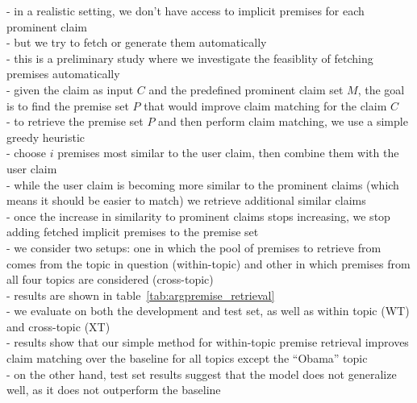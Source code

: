 \noindent - in a realistic setting, we don't have access to implicit premises 
for each prominent claim \\
- but we try to fetch or generate them automatically \\
- this is a preliminary study where we investigate the feasiblity of fetching 
premises automatically \\
- given the claim as input $C$ and the predefined prominent claim set $M$, the goal is to 
find the premise set $P$ that would improve claim matching for the claim $C$ \\
- to retrieve the premise set $P$ and then perform claim matching, we use a simple greedy heuristic \\
- choose $i$ premises most similar to the user claim, then combine them with the user claim \\
- while the user claim is becoming more similar to the prominent claims (which means it should be easier to match)
we retrieve additional similar claims \\
- once the increase in similarity to prominent claims stops increasing, we stop adding fetched implicit
premises to the premise set \\
- we consider two setups: one in which the pool of premises to retrieve from comes from the 
topic in question (within-topic) and other in which premises from all four topics are
considered (cross-topic) \\
- results are shown in table~\ref{tab:argpremise_retrieval} \\
- we evaluate on both the development and test set, as well as within topic (WT)
and cross-topic (XT) \\
- results show that our simple method for within-topic premise retrieval improves
claim matching over the baseline for all topics except the ``Obama'' topic \\
- on the other hand, test set results suggest that the model does not generalize well, 
as it does not outperform the baseline \\

